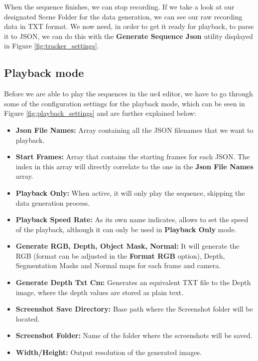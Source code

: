 When the sequence finishes, we can stop recording. If we take a look at our designated Scene Folder for the data generation, we can see our raw recording data in TXT format. We now need, in order to get it ready for playback, to parse it to JSON, we can do this with the \textbf{Generate Sequence Json} utility displayed in Figure \ref{fig:tracker_settings}.

\subsection{Playback mode}
\label{sec:playback}
Before we are able to play the sequences in the \gls{ue4} editor, we have to go through some of the configuration settings for the playback mode, which can be seen in Figure \ref{fig:playback_settings} and are further explained below:

\begin{itemize}
	\item \textbf{Json File Names:} Array containing all the JSON filenames that we want to playback.
	\item \textbf{Start Frames:} Array that contains the starting frames for each JSON. The index in this array will directly correlate to the one in the \textbf{Json File Names} array.
	\item \textbf{Playback Only:} When active, it will only play the sequence, skipping the data generation process.
	\item \textbf{Playback Speed Rate:} As its own name indicates, allows to set the speed of the playback, although it can only be used in \textbf{Playback Only} mode. 
	\item \textbf{Generate RGB, Depth, Object Mask, Normal:} It will generate the RGB (format can be adjusted in the \textbf{Format RGB} option), Depth, Segmentation Masks and Normal maps for each frame and camera.
	\item \textbf{Generate Depth Txt Cm:} Generates an equivalent TXT file to the Depth image, where the depth values are stored as plain text.
	\item \textbf{Screenshot Save Directory:} Base path where the Screenshot folder will be located.
	\item \textbf{Screenshot Folder:} Name of the folder where the screenshots will be saved.
	\item \textbf{Width/Height:} Output resolution of the generated images.
\end{itemize}

